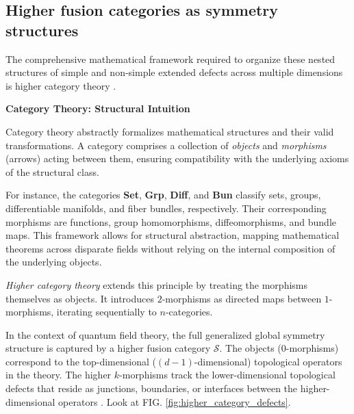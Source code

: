 \documentclass[aps,preprint,nofootinbib,preprintnumbers,eqsecnum,superscriptaddress]{revtex4}
\numberwithin{equation}{section}
\begin{document}
\subsection{Higher fusion categories as symmetry structures}

The comprehensive mathematical framework required to organize these nested structures of simple and non-simple extended defects across multiple dimensions is higher category theory \cite{schafernameki2023ictplecturesnoninvertiblegeneralized}.

\begin{tcolorbox}
{\bf Category Theory: Structural Intuition}

Category theory abstractly formalizes mathematical structures and their valid transformations. A category comprises a collection of {\it objects} and {\it morphisms} (arrows) acting between them, ensuring compatibility with the underlying axioms of the structural class.

For instance, the categories {\bf Set}, {\bf Grp}, {\bf Diff}, and {\bf Bun} classify sets, groups, differentiable manifolds, and fiber bundles, respectively. Their corresponding morphisms are functions, group homomorphisms, diffeomorphisms, and bundle maps. This framework allows for structural abstraction, mapping mathematical theorems across disparate fields without relying on the internal composition of the underlying objects.

{\it Higher category theory} extends this principle by treating the morphisms themselves as objects. It introduces $2$-morphisms as directed maps between $1$-morphisms, iterating sequentially to $n$-categories.
\end{tcolorbox}

In the context of quantum field theory, the full generalized global symmetry structure is captured by a higher fusion category $\mathcal{S}$. The objects ($0$-morphisms) correspond to the top-dimensional ($(d-1)$-dimensional) topological operators in the theory. The higher $k$-morphisms track the lower-dimensional topological defects that reside as junctions, boundaries, or interfaces between the higher-dimensional operators \cite{schafernameki2023ictplecturesnoninvertiblegeneralized}. Look at FIG. \ref{fig:higher_category_defects}.
\end{document}
